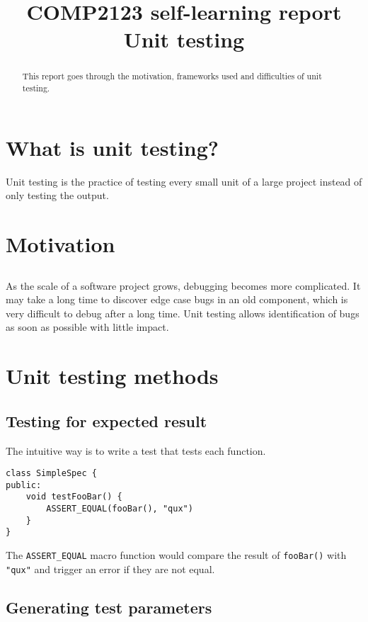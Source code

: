 \documentclass{article}
\title{COMP2123 self-learning report \\
Unit testing}
\begin{document}
\maketitle
\begin{abstract}
	This report goes through the motivation, frameworks used and difficulties of unit testing.
\end{abstract}
\newpage

{\hypersetup{hidelinks}
	\tableofcontents
}
\newpage

\section{What is unit testing?}
Unit testing is the practice of testing every small unit of a large project instead of only testing the output.

\section{Motivation}
\subsection{}
As the scale of a software project grows, debugging becomes more complicated.
It may take a long time to discover edge case bugs in an old component, which is very difficult to debug after a long time.
Unit testing allows identification of bugs as soon as possible with little impact.

\section{Unit testing methods}
\subsection{Testing for expected result}
The intuitive way is to write a test that tests each function.

\begin{lstlisting}[style=CppStyle]
class SimpleSpec {
public:
	void testFooBar() {
		ASSERT_EQUAL(fooBar(), "qux")
	}
}
\end{lstlisting}

The \texttt{ASSERT\_EQUAL} macro function would compare the result of \texttt{fooBar()} with \texttt{"qux"} and trigger an error if they are not equal.

\subsection{Generating test parameters}
\end{document}
